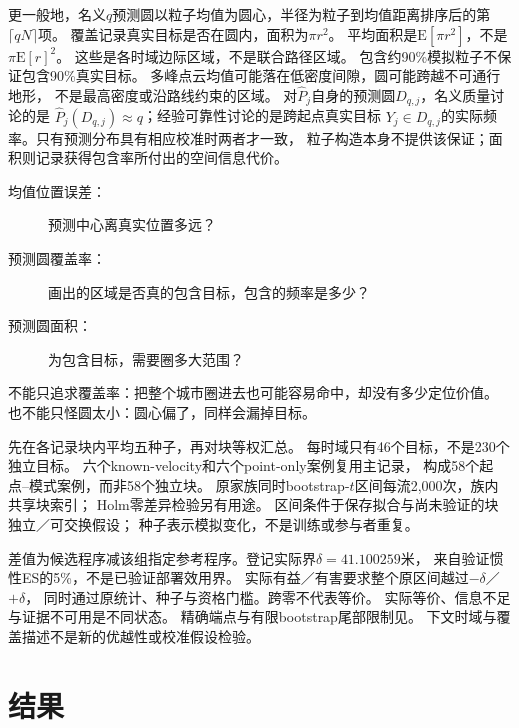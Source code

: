 更一般地，名义$q$预测圆以粒子均值为圆心，半径为粒子到均值距离排序后的第$\lceil qN\rceil$项。
覆盖记录真实目标是否在圆内，面积为$\pi r^2$。
平均面积是$\mathrm E[\pi r^2]$，不是$\pi\mathrm E[r]^2$。
这些是各时域边际区域，不是联合路径区域。
包含约90\%模拟粒子不保证包含90\%真实目标。
多峰点云均值可能落在低密度间隙，圆可能跨越不可通行地形，
不是最高密度或沿路线约束的区域。
对$\widehat P_j$自身的预测圆$D_{q,j}$，名义质量讨论的是
$\widehat P_j(D_{q,j})\approx q$；经验可靠性讨论的是跨起点真实目标
$Y_j\in D_{q,j}$的实际频率。只有预测分布具有相应校准时两者才一致，
粒子构造本身不提供该保证；面积则记录获得包含率所付出的空间信息代价。
\begin{description}
\item[均值位置误差：] 预测中心离真实位置多远？
\item[预测圆覆盖率：] 画出的区域是否真的包含目标，包含的频率是多少？
\item[预测圆面积：] 为包含目标，需要圈多大范围？
\end{description}
不能只追求覆盖率：把整个城市圈进去也可能容易命中，却没有多少定位价值。
也不能只怪圆太小：圆心偏了，同样会漏掉目标。

先在各记录块内平均五种子，再对块等权汇总。
每时域只有46个目标，不是230个独立目标。
六个known-velocity和六个point-only案例复用主记录，
构成58个起点--模式案例，而非58个独立块。
原家族同时bootstrap-$t$区间每流2,000次，族内共享块索引；
Holm零差异检验另有用途\cite{holm1979,davison1997}。
区间条件于保存拟合与尚未验证的块独立／可交换假设；
种子表示模拟变化，不是训练或参与者重复。

差值为候选程序减该组指定参考程序。登记实际界$\delta=41.100259$米，
来自验证惯性ES的5\%，不是已验证部署效用界。
实际有益／有害要求整个原区间越过$-\delta$／$+\delta$，
同时通过原统计、种子与资格门槛。跨零不代表等价。
实际等价、信息不足与证据不可用是不同状态。
精确端点与有限bootstrap尾部限制见。
下文时域与覆盖描述不是新的优越性或校准假设检验。

\section{结果}\label{sec:method-results}\hypertarget{sec:method-results}{}
